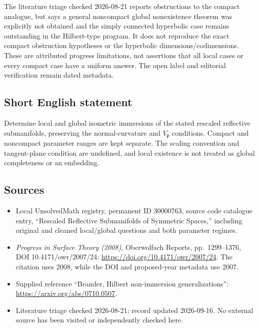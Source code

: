 \documentclass[11pt]{article}
\begin{document}
The literature triage checked 2026-08-21 reports obstructions to the compact analogue, but says a general noncompact global nonexistence theorem was explicitly not obtained and the simply connected hyperbolic case remains outstanding in the Hilbert-type program. It does not reproduce the exact compact obstruction hypotheses or the hyperbolic dimensions/codimensions. These are attributed progress limitations, not assertions that all local cases or every compact case have a uniform answer. The open label and editorial verification remain dated metadata.
\subsection{Short English statement}
Determine local and global isometric immersions of the stated rescaled reflective submanifolds, preserving the normal-curvature and \(V_{\mathfrak p}\) conditions. Compact and noncompact parameter ranges are kept separate. The scaling convention and tangent-plane condition are undefined, and local existence is not treated as global completeness or an embedding.
\subsection{Sources}
\begin{itemize}
\item Local UnsolvedMath registry, permanent ID 30000763, source code catalogue entry, ``Rescaled Reflective Submanifolds of Symmetric Spaces,'' including original and cleaned local/global questions and both parameter regimes.
\item \emph{Progress in Surface Theory (2008)}, Oberwolfach Reports, pp.\ 1299--1376, DOI 10.4171/owr/2007/24: \url{https://doi.org/10.4171/owr/2007/24}. The citation uses 2008, while the DOI and proposed-year metadata use 2007.
\item Supplied reference ``Brander, Hilbert non-immersion generalizations'': \url{https://arxiv.org/abs/0710.0507}.
\item Literature triage checked 2026-08-21; record updated 2026-09-16. No external source has been visited or independently checked here.
\end{itemize}
\end{document}
